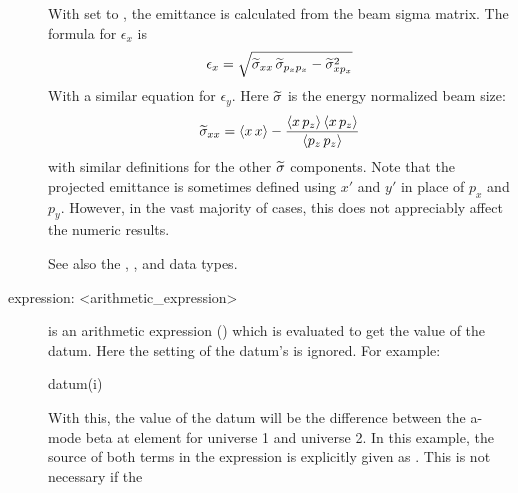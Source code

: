 \begin{description}
With  set to , the emittance is calculated from the beam sigma
matrix. The formula for $\epsilon_x$ is
\begin{equation}
  \epsilon_x = \sqrt{ \widetilde\sigma_{xx} \, \widetilde\sigma_{p_xp_x} - \widetilde\sigma_{xp_x}^2}
\end{equation}
With a similar equation for $\epsilon_y$. Here $\widetilde\sigma$ is the energy normalized
beam size:
\begin{equation}
  \widetilde\sigma_{xx} = \langle x \, x \rangle - 
  \frac{\langle x \, p_z \rangle \, \langle x \, p_z \rangle}{\langle p_z \, p_z \rangle}
\end{equation}
with similar definitions for the other $\widetilde\sigma$ components. 
Note that the projected emittance is sometimes defined using
$x'$ and $y'$ in place of $p_x$ and $p_y$. However, in the vast
majority of cases, this does not appreciably affect the numeric
results.

See also the , , and
 data types.

  \item[expression: <arithmetic_expression>] \Newline
{} is an arithmetic expression () which
is evaluated to get the value of the datum. Here the setting of the datum's
 is ignored.  For example:
\begin{example}
  datum(i)%
\end{example}
With this, the value of the datum will be the difference between the a-mode beta at
element  for universe 1 and universe 2. In this example, the source of both terms
in the expression is explicitly given as .  This is not necessary if the
\vn{datum%
\begin{example}
  datum(i)%
  datum(i)%
\end{example}
An expression can also be used as the \vn{default_data_type}. In this case, the evaluation
point is implicit. For example:
\begin{example}
  default_data_source = "data"
  default_data_type = "expression: 1@beta.a - 2@beta.a"
\end{example}
which is equivalent to:
\begin{example}
  default_data_type = "expression: 1@data::beta.a - 2@data::beta.a"
\end{example}

}
\end{description}
